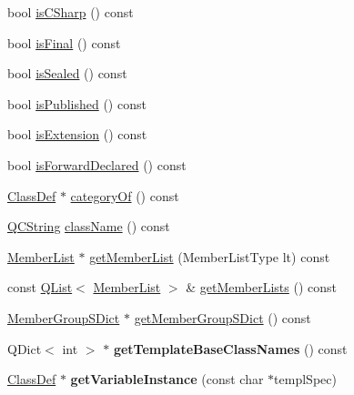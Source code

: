 \begin{DoxyCompactItemize}
bool \mbox{\hyperlink{class_class_def_af721bca7d2823fcbaacfffb033f8b0a4}{is\+C\+Sharp}} () const
\item 
bool \mbox{\hyperlink{class_class_def_af9b24ced8a63862c803cee39e97cee45}{is\+Final}} () const
\item 
bool \mbox{\hyperlink{class_class_def_aca5d89dd62a87c6cfcb0752e4256fd5c}{is\+Sealed}} () const
\item 
bool \mbox{\hyperlink{class_class_def_a83232faa3ba4a974b2faf689662370e1}{is\+Published}} () const
\item 
bool \mbox{\hyperlink{class_class_def_aa99ab74b431ee591f88e23d66c50b479}{is\+Extension}} () const
\item 
bool \mbox{\hyperlink{class_class_def_acef8646f7fc385a9cb9858f5b4d4c2b3}{is\+Forward\+Declared}} () const
\item 
\mbox{\hyperlink{class_class_def}{Class\+Def}} $\ast$ \mbox{\hyperlink{class_class_def_a01765ff58d2117372f4f46e04e5a55b1}{category\+Of}} () const
\item 
\mbox{\hyperlink{class_q_c_string}{Q\+C\+String}} \mbox{\hyperlink{class_class_def_a67e54a054e5063b25e7fe86257e3225c}{class\+Name}} () const
\item 
\mbox{\hyperlink{class_member_list}{Member\+List}} $\ast$ \mbox{\hyperlink{class_class_def_ac4a972d1beb240037c33dff4880c059c}{get\+Member\+List}} (Member\+List\+Type lt) const
\item 
const \mbox{\hyperlink{class_q_list}{Q\+List}}$<$ \mbox{\hyperlink{class_member_list}{Member\+List}} $>$ \& \mbox{\hyperlink{class_class_def_a6748470a98331298884063a451e2f848}{get\+Member\+Lists}} () const
\item 
\mbox{\hyperlink{class_member_group_s_dict}{Member\+Group\+S\+Dict}} $\ast$ \mbox{\hyperlink{class_class_def_aa145db93c3349007135e65ff9ad45880}{get\+Member\+Group\+S\+Dict}} () const
\item 
\mbox{\label{class_class_def_a34c75679c1e74d812e0e7d006c0467e1}} 
Q\+Dict$<$ int $>$ $\ast$ {\bfseries get\+Template\+Base\+Class\+Names} () const
\item 
\mbox{\label{class_class_def_ab9f9b3544327fa23a59b4a37c9b8a96c}} 
\mbox{\hyperlink{class_class_def}{Class\+Def}} $\ast$ {\bfseries get\+Variable\+Instance} (const char $\ast$templ\+Spec)
\item 
\mbox{\label{class_class_def_a0808d9ef1e5d4e3660ec1b5457602014}} 

\end{DoxyCompactItemize}
